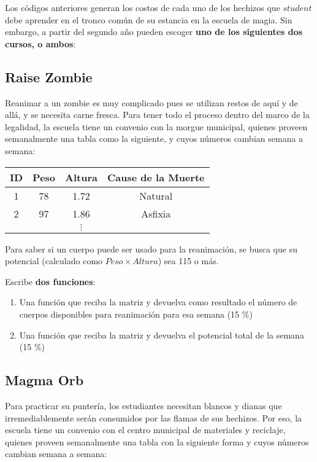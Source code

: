 \documentclass[11pt, onside]{article}
\begin{document}
Los códigos anteriores generan los costos de cada uno de los hechizos que $student$ debe aprender en el tronco común de su estancia en la escuela de magia.
Sin embargo, a partir del segundo año pueden escoger \textbf{uno de los siguientes dos cursos, o ambos}:

\subsection{Raise Zombie}

Reanimar a un zombie es muy complicado pues se utilizan restos de aquí y de allá,
y se necesita carne fresca.
Para tener todo el proceso dentro del marco de la legalidad, la escuela tiene un convenio con la morgue municipal, quienes proveen semanalmente una tabla como la siguiente, y cuyos números cambian semana a semana:

\begin{table}[htbp]
    \centering
    \begin{tabular}{@{}cccc@{}}
    \toprule
    \textbf{ID} & \textbf{Peso} & \textbf{Altura} & \textbf{Cause de la Muerte} \\ \midrule
    1 & 78 & 1.72 & Natural \\
    2 & 97 & 1.86 & Asfixia \\
     &  & $\vdots$ &  \\ \bottomrule
    \end{tabular}
\end{table}

Para saber si un cuerpo puede ser usado para la reanimación, se busca que su potencial (calculado como $Peso \times Altura$) sea 115 o más.

\bigskip

Escribe \textbf{dos funciones}:
\begin{enumerate}
    \item Una función que reciba la matriz y devuelva como resultado el número de cuerpos disponibles para reanimación para esa semana (15 \%)
    \item Una función que reciba la matriz y devuelva el potencial total de la semana (15 \%)
\end{enumerate}

\subsection{Magma Orb}

Para practicar su puntería, los estudiantes necesitan blancos y dianas que irremediablemente serán consumidos por las flamas de sus hechizos.
Por eso, la escuela tiene un convenio con el centro municipal de materiales y reciclaje, quienes proveen semanalmente una tabla con la siguiente forma y cuyos números cambian semana a semana:
\end{document}
